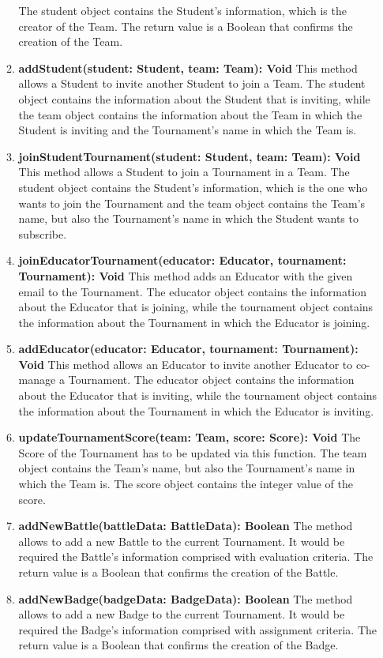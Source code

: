 \begin{enumerate}
\begin{enumerate}[label=$\bullet$]
            The student object contains the Student's information, which is the creator of the Team. The return value is a Boolean that confirms the creation of the Team.
            \item \textbf{addStudent(student: Student, team: Team): Void} This method allows a Student to invite another Student to join a Team. The student object contains the information about the Student that is inviting, while the team
            object contains the information about the Team in which the Student is inviting and the Tournament's name in which the Team is.
            \item \textbf{joinStudentTournament(student: Student, team: Team): Void} This method allows a Student to join a Tournament in a Team. The student object contains the Student's information, which is the one who wants to join 
            the Tournament and the team object contains the Team's name, but also the Tournament's name in which the Student wants to subscribe.
            \item \textbf{joinEducatorTournament(educator: Educator, tournament: Tournament): Void} This method adds an Educator with the given email to the Tournament. The educator object contains the information about the Educator
            that is joining, while the tournament object contains the information about the Tournament in which the Educator is joining.
            \item \textbf{addEducator(educator: Educator, tournament: Tournament): Void} This method allows an Educator to invite another Educator to co-manage a Tournament. The educator object contains the information about the Educator
            that is inviting, while the tournament object contains the information about the Tournament in which the Educator is inviting.
            \item \textbf{updateTournamentScore(team: Team, score: Score): Void} The Score of the Tournament has to be updated via this function. The team object contains the Team's name, but also the Tournament's name in which the Team is. The score object contains the integer value of the score.
            \item \textbf{addNewBattle(battleData: BattleData): Boolean} The method allows to add a new Battle to the current Tournament. It would be required the Battle's information comprised with evaluation criteria. The return value is a Boolean that confirms the creation of the Battle.
            \item \textbf{addNewBadge(badgeData: BadgeData): Boolean} The method allows to add a new Badge to the current Tournament. It would be required the Badge's information comprised with assignment criteria. The return value is a Boolean that confirms the creation of the Badge.

\end{enumerate}
\end{enumerate}
